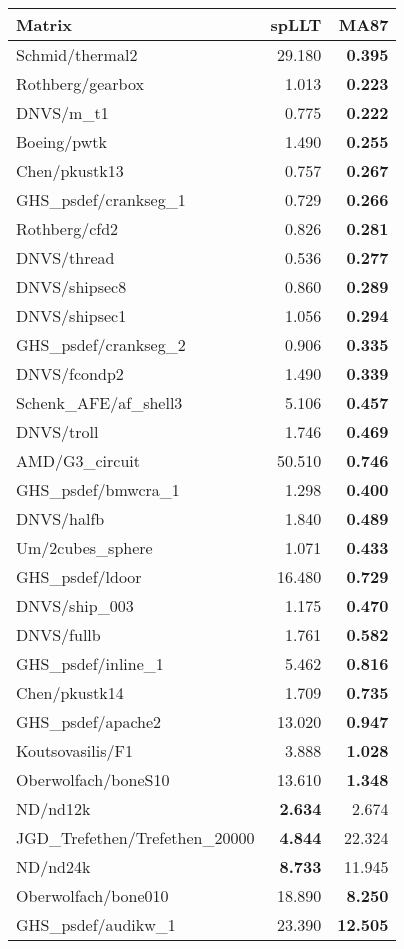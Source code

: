 \begin{tabular}{l|rr}
  \hline
  Matrix                          & spLLT     & MA87       \\
  \hline
  Schmid/thermal2                 & 29.180    & \bf 0.395  \\
  Rothberg/gearbox                & 1.013     & \bf 0.223  \\
  DNVS/m\_t1                      & 0.775     & \bf 0.222  \\
  Boeing/pwtk                     & 1.490     & \bf 0.255  \\
  Chen/pkustk13                   & 0.757     & \bf 0.267  \\
  GHS\_psdef/crankseg\_1          & 0.729     & \bf 0.266  \\
  Rothberg/cfd2                   & 0.826     & \bf 0.281  \\
  DNVS/thread                     & 0.536     & \bf 0.277  \\
  DNVS/shipsec8                   & 0.860     & \bf 0.289  \\
  DNVS/shipsec1                   & 1.056     & \bf 0.294  \\
  GHS\_psdef/crankseg\_2          & 0.906     & \bf 0.335  \\
  DNVS/fcondp2                    & 1.490     & \bf 0.339  \\
  Schenk\_AFE/af\_shell3          & 5.106     & \bf 0.457  \\
  DNVS/troll                      & 1.746     & \bf 0.469  \\
  AMD/G3\_circuit                 & 50.510    & \bf 0.746  \\
  GHS\_psdef/bmwcra\_1            & 1.298     & \bf 0.400  \\
  DNVS/halfb                      & 1.840     & \bf 0.489  \\
  Um/2cubes\_sphere               & 1.071     & \bf 0.433  \\
  GHS\_psdef/ldoor                & 16.480    & \bf 0.729  \\
  DNVS/ship\_003                  & 1.175     & \bf 0.470  \\
  DNVS/fullb                      & 1.761     & \bf 0.582  \\
  GHS\_psdef/inline\_1            & 5.462     & \bf 0.816  \\
  Chen/pkustk14                   & 1.709     & \bf 0.735  \\
  GHS\_psdef/apache2              & 13.020    & \bf 0.947  \\
  Koutsovasilis/F1                & 3.888     & \bf 1.028  \\
  Oberwolfach/boneS10             & 13.610    & \bf 1.348  \\
  ND/nd12k                        & \bf 2.634 & 2.674      \\
  JGD\_Trefethen/Trefethen\_20000 & \bf 4.844 & 22.324     \\
  ND/nd24k                        & \bf 8.733 & 11.945     \\
  Oberwolfach/bone010             & 18.890    & \bf 8.250  \\
  GHS\_psdef/audikw\_1            & 23.390    & \bf 12.505 \\

  \hline
\end{tabular}
